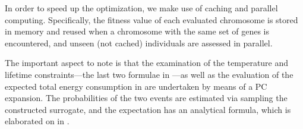 In order to speed up the optimization, we make use of caching and parallel
computing. Specifically, the fitness value of each evaluated chromosome is
stored in memory and reused when a chromosome with the same set of genes is
encountered, and unseen (not cached) individuals are assessed in parallel.

The important aspect to note is that the examination of the temperature and
lifetime constraints---the last two formulae in
---as well as the evaluation of the
expected total energy consumption in  are
undertaken by means of a \ac{PC} expansion. The probabilities of the two events
are estimated via sampling the constructed surrogate, and the expectation has an
analytical formula, which is elaborated on in .
